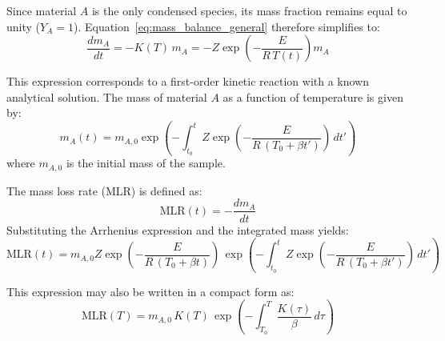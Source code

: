 Since material $A$ is the only condensed species, its mass fraction remains equal to unity ($Y_A = 1$).
Equation~\ref{eq:mass_balance_general} therefore simplifies to:
\begin{equation}
\frac{dm_A}{dt}
= - K(T)\, m_A
= - Z \exp\!\left(-\frac{E}{R\,T(t)}\right) m_A
\end{equation}

This expression corresponds to a first-order kinetic reaction with a known analytical solution.
The mass of material $A$ as a function of temperature is given by:
\begin{equation}
m_A(t) =
m_{A,0}
\exp\!\left(
- \int_{t_0}^t {Z}
\exp\!\left(-\frac{E}{R\,(T_0+\beta t')}\right)\, dt'
\right)
\end{equation}
where $m_{A,0}$ is the initial mass of the sample.

The mass loss rate (MLR) is defined as:
\begin{equation}
\mathrm{MLR}(t) = -\frac{dm_A}{dt}
\end{equation}
Substituting the Arrhenius expression and the integrated mass yields:
\begin{equation}
\mathrm{MLR}(t) = m_{A,0}
Z \exp\!\left(-\frac{E}{R\,(T_0 +\beta t)}\right)
\,
\exp\!\left(
- \int _{t_0}^t Z \exp\!\left(-\frac{E}{R\,(T_0 +\beta t')}\right)\, dt'
\right)
\end{equation}

This expression may also be written in a compact form as:
\begin{equation}
\mathrm{MLR}(T) = m_{A,0}\, K(T)\,
\exp\!\left( - \int_{T_0}^T \frac{K(\tau)}{\beta}\, d\tau \right)
\end{equation}

